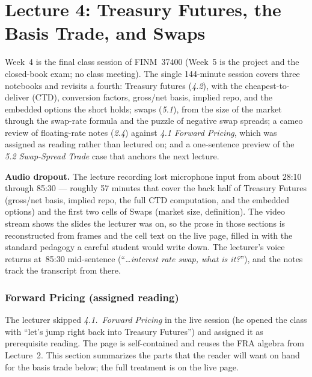 \part*{Lecture 4: Treasury Futures, the Basis Trade, and Swaps}

Week~4 is the final class session of FINM~37400 (Week~5 is the project and the
closed-book exam; no class meeting). The single 144-minute session covers
three notebooks and revisits a fourth: Treasury futures (\emph{4.2}), with
the cheapest-to-deliver (CTD), conversion factors, gross/net basis, implied
repo, and the embedded options the short holds; swaps (\emph{5.1}), from the
size of the market through the swap-rate formula and the puzzle of negative
swap spreads; a cameo review of floating-rate notes (\emph{2.4}) against
\emph{4.1 Forward Pricing}, which was assigned as reading rather than
lectured on; and a one-sentence preview of the \emph{5.2 Swap-Spread Trade}
case that anchors the next lecture.

\begin{tipblock}
\textbf{Audio dropout.} The lecture recording lost microphone input from
about 28:10 through 85:30 --- roughly 57 minutes that cover the back half of
Treasury Futures (gross/net basis, implied repo, the full CTD computation,
and the embedded options) and the first two cells of Swaps (market size,
definition). The video stream shows the slides the lecturer was on, so the
prose in those sections is reconstructed from frames and the cell text on
the live page, filled in with the standard pedagogy a careful student
would write down. The lecturer's voice returns at~85:30 mid-sentence
(``\emph{\ldots interest rate swap, what is it?}''), and the notes track the
transcript from there.
\end{tipblock}

\section{Forward Pricing (assigned reading)}\label{L4-sec:fwd}

The lecturer skipped \emph{4.1.~Forward Pricing} in the live session (he
opened the class with ``let's jump right back into Treasury Futures'') and
assigned it as prerequisite reading. The page is self-contained and reuses
the FRA algebra from Lecture~2. This section summarizes the parts that the
reader will want on hand for the basis trade below; the full treatment is
on the live page.


